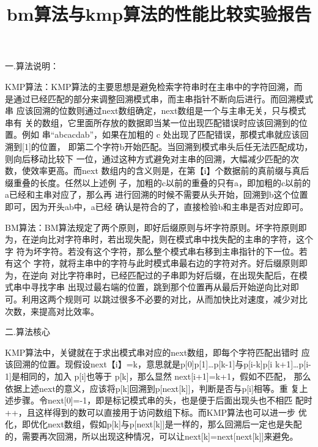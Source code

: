 \documentclass[12pt]{article}
\title{bm算法与kmp算法的性能比较实验报告}
\author{ }
\begin{document}
\maketitle

\begin{Large}
	\heiti
	 一.算法说明：
\end{Large}

KMP算法：KMP算法的主要思想是避免检索字符串时在主串中的字符回溯，而
是通过已经匹配的部分来调整回溯模式串，而主串指针不断向后进行。而回溯模式串
应该回溯的位数则通过next数组确定，next数组是一个与主串无关，只与模式串有
关的数组，它里面所存放的数据即当某一位出现匹配错误时应该回溯到的位置。例如
串“abcacdab”，如果在加粗的 c 处出现了匹配错误，那模式串就应该回溯到[1]的位置，
即第二个字符b开始匹配。当回溯到模式串头后任无法匹配成功，则向后移动比较下
一位，通过这种方式避免对主串的回溯，大幅减少匹配的次数，使效率更高。而next
数组内的含义则是，在第【i】个数据前的真前缀与真后缀重叠的长度。任然以上述例
子，加粗的c以前的重叠的只有a，即加粗的c以前的a已经和主串对应了，那么再
进行回溯的时候不需要从头开始，回溯到b这个位置即可，因为开头ab中，a已经
确认是符合的了，直接检验b和主串是否对应即可。 

BM算法：BM算法规定了两个原则，即好后缀原则与坏字符原则。坏字符原则即
为，在逆向比对字符串时，若出现失配，则在模式串中找失配的主串的字符，这个字
符为坏字符。若没有这个字符，那么整个模式串右移到主串指针的下一位。若有这个
字符，就将主串中的字符与此时模式串最右边的字符对齐。好后缀原则即为，在逆向
对比字符串时，已经匹配过的子串即为好后缀，在出现失配后，在模式串中寻找字串
出现过最右端的位置，跳到那个位置再从最后开始逆向比对即可。利用这两个规则可
以跳过很多不必要的对比，从而加快比对速度，减少对比次数，来提高对比效率。

\begin{Large}
	{\noindent
		\heiti
二.算法核心 } 
\end{Large}

KMP算法中，关键就在于求出模式串对应的next数组，即每个字符匹配出错时
应该回溯的位置。现假设next【i】=k，意思就是p[0]p[1]…p[k-1]与p[i-k]p[i
k+1]…p[i-1]是相同的，加入 p[i]也等于 p[k]，那么显然 next[i+1]=k+1，假如不匹配，
那么依据上述next的意义，应该将p[k]回溯到p[next[k]]，判断是否与p[i]相等。重
复上述步骤。令next[0]=-1，即是标记模式串的头，也是便于后面出现头也不相匹
配时++，且这样得到的数可以直接用于访问数组下标。而KMP算法也可以进一步
优化，即优化next数组，假如p[k]与p[next[k]]是一样的，那么回溯后一定也是失配
的，需要再次回溯，所以出现这种情况，可以让next[k]=next[next[k]]来避免。 
\end{document}
